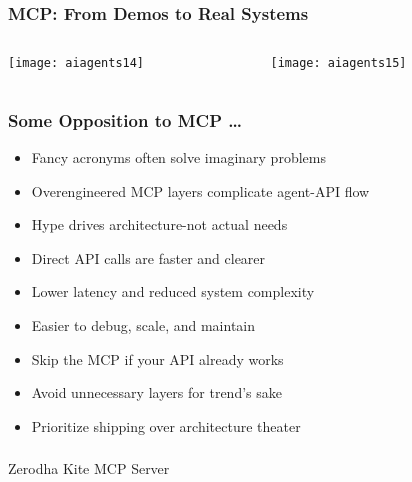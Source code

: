 \begin{frame}[fragile]\frametitle{MCP: From Demos to Real Systems}

\begin{columns}
    \begin{column}[T]{0.5\linewidth}
		\begin{center}
		\texttt{[image: aiagents14]}
		\end{center}

    \end{column}
    \begin{column}[T]{0.5\linewidth}
		\begin{center}
		\texttt{[image: aiagents15]}
		\end{center}
    \end{column}
  \end{columns}
  


\end{frame}

\begin{frame}[fragile]\frametitle{Some Opposition to MCP \ldots}
    \begin{itemize}
        \item Fancy acronyms often solve imaginary problems
        \item Overengineered MCP layers complicate agent-API flow
        \item Hype drives architecture-not actual needs
        \item Direct API calls are faster and clearer
        \item Lower latency and reduced system complexity
        \item Easier to debug, scale, and maintain	
		\item Skip the MCP if your API already works
        \item Avoid unnecessary layers for trend's sake
        \item Prioritize shipping over architecture theater
    \end{itemize}
\end{frame}


\begin{frame}[fragile]\frametitle{}
\begin{center}
{\Large Zerodha Kite MCP Server}
\end{center}
\end{frame}
